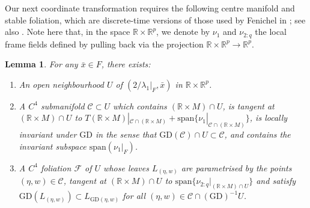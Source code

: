 \documentclass{article}
\newcommand{\RB}{\mathbb{R}}
\newcommand{\FC}{\mathcal{F}}
\newcommand{\CC}{\mathcal{C}}
\newcommand{\GD}{\mathrm{GD}}
\theoremstyle{plain}
\newtheorem{lemma}[theorem]{Lemma}
\theoremstyle{definition}
\theoremstyle{remark}
\begin{document}
Our next coordinate transformation requires the following centre manifold and stable foliation, which are discrete-time versions of those used by Fenichel in \cite{fenichel_singular}; see also \cite{fenichel1974asymptotic, fenichel1977asymptotic, hpsinvariant}. Note here that, in the space $\RB\times\RB^p$, we denote by $\nu_1$ and $\nu_{2:q}$ the local frame fields defined by pulling back via the projection $\RB\times\RB^p\rightarrow\RB^p$.

\begin{lemma}\label{lem:invariantmanifoldandfoliation}
For any $\bar{x}\in F$, there exists:
\begin{enumerate}
\item An open neighbourhood $U$ of $(2/\lambda_1|_F,\bar{x})$ in $\RB\times\RB^p$.
\item A $C^4$ submanifold $\CC\subset U$ which contains $(\RB\times M)\cap U$, is tangent at $(\RB\times M)\cap U$ to  $T(\RB\times M)|_{\CC\cap (\RB\times M)} + \mathrm{span}\{\nu_1|_{\CC\cap (\RB\times M)}\}$, is locally invariant under $\GD$ in the sense that $\GD(\CC)\cap U\subset \CC$, and contains the invariant subspace $\mathrm{span}(\nu_1|_F)$.
\item A $C^4$ foliation $\FC$ of $U$ whose leaves $L_{(\eta,w)}$ are parametrised by the points $(\eta,w)\in\CC$, tangent at $(\RB\times M)\cap U$ to $\mathrm{span}\{\nu_{2:q}|_{(\RB\times M)\cap U}\}$ and satisfy $\GD(L_{(\eta,w)})\subset L_{\GD(\eta,w)}$ for all $(\eta,w)\in \CC\cap (\GD)^{-1}U$.
\end{enumerate} 
\end{lemma}
\end{document}
